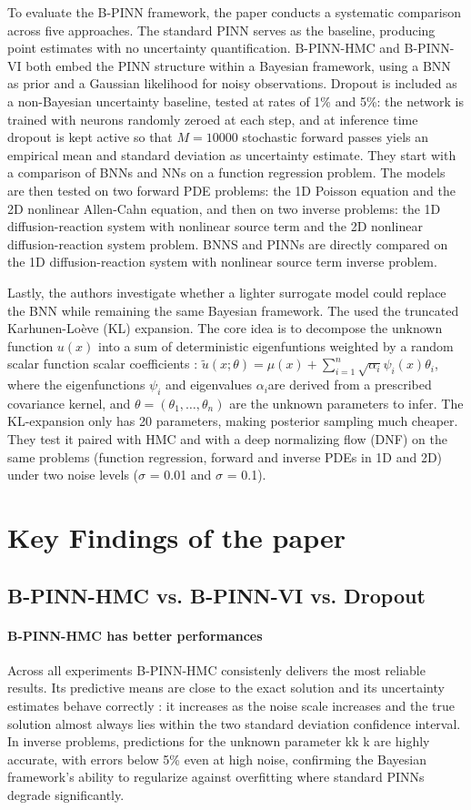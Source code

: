 \documentclass{article}
\begin{document}
To evaluate the B-PINN framework, the paper conducts a systematic comparison across five approaches. The standard PINN serves as the baseline, producing point estimates with no uncertainty quantification. B-PINN-HMC and B-PINN-VI both embed the PINN structure within a Bayesian framework, using a BNN as prior and a Gaussian likelihood for noisy observations. Dropout is included as a non-Bayesian uncertainty baseline, tested at rates of 1\% and 5\%: the network is trained with neurons randomly zeroed at each step, and at inference time dropout is kept active so that $M=10 000$ stochastic forward passes yiels an empirical mean and standard deviation as uncertainty estimate. They start with a comparison of BNNs and NNs on a function regression problem. The models are then tested on two forward PDE problems: the 1D Poisson equation and the 2D nonlinear Allen-Cahn equation, and then on two inverse problems: the 1D diffusion-reaction system with nonlinear source term and the 2D nonlinear diffusion-reaction system problem. BNNS and PINNs are directly compared on  the 1D diffusion-reaction system with nonlinear source term inverse problem.

Lastly, the authors investigate whether a lighter surrogate model could replace the BNN while remaining the same Bayesian framework. The used the truncated Karhunen-Loève (KL) expansion. The core idea is to decompose the unknown function $u(x)$ into a sum of deterministic eigenfuntions weighted by a random scalar function scalar coefficients : $\tilde{u}(x; \theta) = \mu(x) + \sum^n_{i=1} \sqrt{\alpha_i}\psi_i(x)\theta_i$, where the eigenfunctions $\psi_i$  and eigenvalues $\alpha_i$​ are derived from a prescribed covariance kernel, and $\theta = (\theta_1, \dots, \theta_n)
$ are the unknown parameters to infer. The KL-expansion only has 20 parameters, making posterior sampling much cheaper. They test it paired with HMC and with  a deep normalizing flow (DNF) on the same problems (function regression, forward and inverse PDEs in 1D and 2D) under two noise levels ($\sigma$ = 0.01 and $\sigma$ = 0.1).

\section{Key Findings of the paper}
\subsection{B-PINN-HMC vs. B-PINN-VI vs. Dropout}
\paragraph{B-PINN-HMC has better performances} Across all experiments B-PINN-HMC consistenly delivers the most reliable results. Its predictive means are close to the exact solution and its uncertainty estimates behave correctly : it increases as the noise scale increases and the true solution almost always lies within the two standard deviation confidence interval. In inverse problems, predictions for the unknown parameter kk
k are highly accurate, with errors below 5\% even at high noise, confirming the Bayesian framework's ability to regularize against overfitting where standard PINNs degrade significantly.
\end{document}
